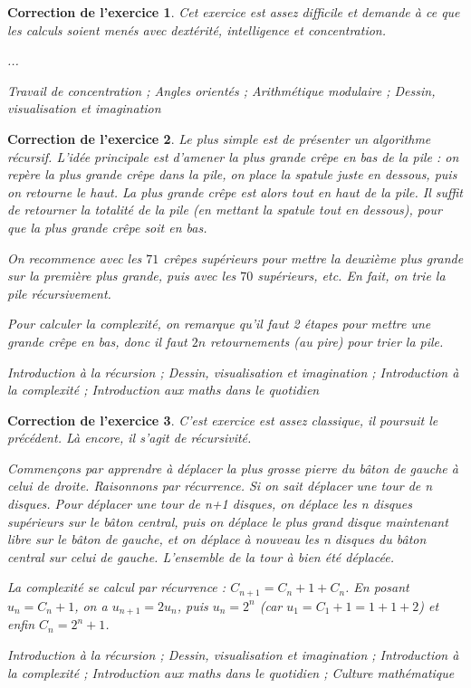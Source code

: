 \documentclass[12pt]{article}
\theoremstyle{break}
\newtheorem{cor}{Correction de l'exercice}
\begin{document}
\begin{cor}
Cet exercice est assez difficile et demande à ce que les calculs soient menés avec dextérité, intelligence et concentration.

...

\textit{Travail de concentration ; Angles orientés ; Arithmétique modulaire ; Dessin, visualisation et imagination}
\end{cor}


\begin{cor}
Le plus simple est de présenter un algorithme récursif. L'idée principale est d'amener la plus grande crêpe en bas de la pile : on repère la plus grande crêpe dans la pile, on place la spatule juste en dessous, puis on retourne le haut. La plus grande crêpe est alors tout en haut de la pile. Il suffit de retourner la totalité de la pile (en mettant la spatule tout en dessous), pour que la plus grande crêpe soit en bas. 

On recommence avec les $71$ crêpes supérieurs pour mettre la deuxième plus grande sur la première plus grande, puis avec les $70$ supérieurs, etc. En fait, on trie la pile récursivement.

Pour calculer la complexité, on remarque qu'il faut 2 étapes pour mettre une grande crêpe en bas, donc il faut $2n$ retournements (au pire) pour trier la pile.

\textit{Introduction à la récursion ; Dessin, visualisation et imagination ; Introduction à la complexité ; Introduction aux maths dans le quotidien}
\end{cor}


\begin{cor}
C'est exercice est assez classique, il poursuit le précédent. Là encore, il s'agit de récursivité.

Commençons par apprendre à déplacer la plus grosse pierre du bâton de gauche à celui de droite. Raisonnons par récurrence. Si on sait déplacer une tour de n disques. Pour déplacer une tour de n+1 disques, on déplace les n disques supérieurs sur le bâton central, puis on déplace le plus grand disque maintenant libre sur le bâton de gauche, et on déplace à nouveau les n disques du bâton central sur celui de gauche. L'ensemble de la tour à bien été déplacée.

La complexité se calcul par récurrence : $C_{n+1} = C_n + 1 + C_n$. En posant $u_n = C_n + 1$, on a $u_{n+1} = 2u_n$, puis $u_n = 2^n$ (car $u_1 = C_1 + 1 = 1+1 + 2$) et enfin $C_n = 2^n + 1$.

\textit{Introduction à la récursion ; Dessin, visualisation et imagination ; Introduction à la complexité ; Introduction aux maths dans le quotidien ; Culture mathématique}
\end{cor}
\end{document}
